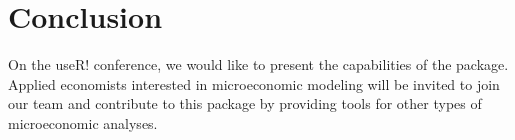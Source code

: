 \section{Conclusion}

On the useR! conference,
we would like to present the capabilities of the  package.
Applied economists interested in microeconomic modeling will be invited to
join our team and contribute to this package
by providing tools for other types of microeconomic analyses.

